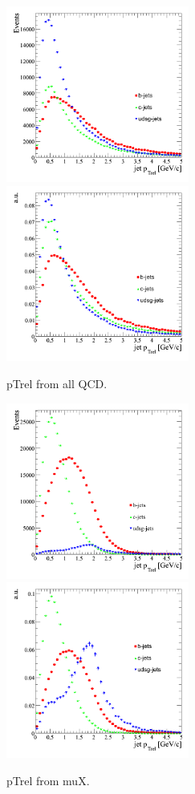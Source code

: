 \begin{figure}[htbp]
  \begin{center}
    \includegraphics[width=60mm]{Figures/jet_ptrel_allqcd.png}
    \includegraphics[width=60mm]{Figures/jet_ptrel_norm_allqcd.png}
  \end{center}
  \caption{pTrel from all QCD.}
  \label{fig:jet_ptrel}
\end{figure}


\begin{figure}[htbp]
  \begin{center}
    \includegraphics[width=60mm]{Figures/jet_ptrel_muX.png}
    \includegraphics[width=60mm]{Figures/jet_ptrel_norm_muX.png}
  \end{center}
  \caption{pTrel from muX.}
  \label{fig:jet_ptrel}
\end{figure}


